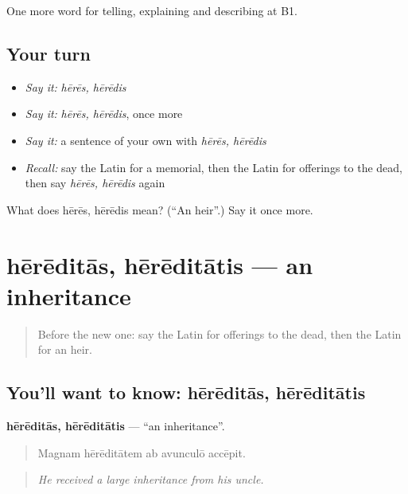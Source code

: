 \begin{grammarlens}[title={What you've built}]
One more word for telling, explaining and describing at B1.
\end{grammarlens}

\subsection*{Your turn}
\begin{itemize}
\raggedright
  \item \emph{Say it:} \emph{hērēs, hērēdis}
  \item \emph{Say it:} \emph{hērēs, hērēdis}, once more
  \item \emph{Say it:} a sentence of your own with \emph{hērēs, hērēdis}
  \item \emph{Recall:} say the Latin for a memorial, then the Latin for offerings to the dead, then say \emph{hērēs, hērēdis} again
\end{itemize}

\begin{tcolorbox}[breakable,colback=teal!4,colframe=teal!35!black,title={Before you move on}]
What does hērēs, hērēdis mean? (\textquotedblleft{}An heir\textquotedblright{}.) Say it once more.
\end{tcolorbox}
\section[hērēditās, hērēditātis]{hērēditās, hērēditātis — an inheritance}

\label{lesson:LA-C332-hereditas}



\begin{quote}
Before the new one: say the Latin for offerings to the dead, then the Latin for an heir.
\end{quote}

\subsection*{You'll want to know: hērēditās, hērēditātis}
\textbf{hērēditās, hērēditātis} — \textquotedblleft{}an inheritance\textquotedblright{}.

\begin{quote}
Magnam hērēditātem ab avunculō accēpit.
\end{quote}

\begin{quote}
\emph{He received a large inheritance from his uncle.}
\end{quote}

